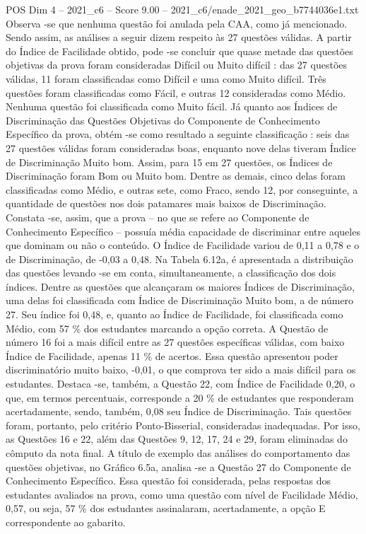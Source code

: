 \begin{textsample}{POS Dim 4 – 2021\_c6 – Score 9.00 – 2021\_c6/enade\_2021\_geo\_b7744036e1.txt}
Observa -se que nenhuma questão foi anulada pela CAA, como já mencionado.
Sendo assim, as análises a seguir dizem respeito às 27 questões válidas.
A partir do Índice de Facilidade obtido, pode -se concluir que quase metade das questões objetivas da prova foram consideradas Difícil ou Muito difícil : das 27 questões válidas, 11 foram classificadas como Difícil e uma como Muito difícil.
Três questões foram classificadas como Fácil, e outras 12 consideradas como Médio.
Nenhuma questão foi classificada como Muito fácil.
Já quanto aos Índices de Discriminação das Questões Objetivas do Componente de Conhecimento Específico da prova, obtém -se como resultado a seguinte classificação : seis das 27 questões válidas foram consideradas boas, enquanto nove delas tiveram Índice de Discriminação Muito bom.
Assim, para 15 em 27 questões, os Índices de Discriminação foram Bom ou Muito bom.
Dentre as demais, cinco delas foram classificadas como Médio, e outras sete, como Fraco, sendo 12, por conseguinte, a quantidade de questões nos dois patamares mais baixos de Discriminação.
Constata -se, assim, que a prova – no que se refere ao Componente de Conhecimento Específico – possuía média capacidade de discriminar entre aqueles que dominam ou não o conteúdo.
O Índice de Facilidade variou de 0,11 a 0,78 e o de Discriminação, de -0,03 a 0,48.
Na Tabela 6.12a, é apresentada a distribuição das questões levando -se em conta, simultaneamente, a classificação dos dois índices.
Dentre as questões que alcançaram os maiores Índices de Discriminação, uma delas foi classificada com Índice de Discriminação Muito bom, a de número 27.
Seu índice foi 0,48, e, quanto ao Índice de Facilidade, foi classificada como Médio, com 57 \% dos estudantes marcando a opção correta.
A Questão de número 16 foi a mais difícil entre as 27 questões específicas válidas, com baixo Índice de Facilidade, apenas 11 \% de acertos.
Essa questão apresentou poder discriminatório muito baixo, -0,01, o que comprova ter sido a mais difícil para os estudantes.
Destaca -se, também, a Questão 22, com Índice de Facilidade 0,20, o que, em termos percentuais, corresponde a 20 \% de estudantes que responderam acertadamente, sendo, também, 0,08 seu Índice de Discriminação.
Tais questões foram, portanto, pelo critério Ponto-Bisserial, consideradas inadequadas.
Por isso, as Questões 16 e 22, além das Questões 9, 12, 17, 24 e 29, foram eliminadas do cômputo da nota final.
A título de exemplo das análises do comportamento das questões objetivas, no Gráfico 6.5a, analisa -se a Questão 27 do Componente de Conhecimento Específico.
Essa questão foi considerada, pelas respostas dos estudantes avaliados na prova, como uma questão com nível de Facilidade Médio, 0,57, ou seja, 57 \% dos estudantes assinalaram, acertadamente, a opção E correspondente ao gabarito.

\end{textsample}
